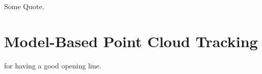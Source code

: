 \begin{savequote}[75mm]
Some Quote.
\end{savequote}

\chapter{Model-Based Point Cloud Tracking}
\label{Chap:ModelBasedTracking}
 for having a good opening line. 


